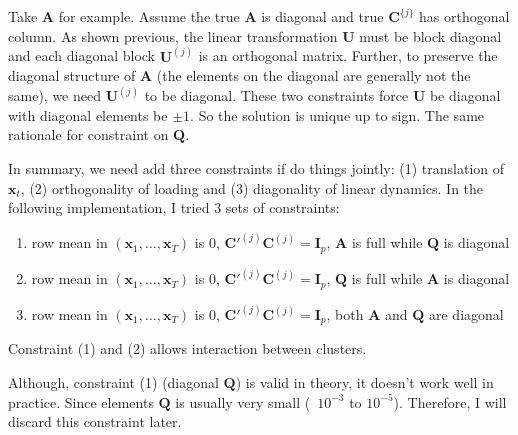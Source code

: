 \documentclass[]{article}
\begin{document}
Take \(\mathbf{A}\) for example. Assume the true \(\mathbf{A}\) is diagonal and true
\(\mathbf{C}^{\{ j\}}\) has orthogonal column. As shown previous, the linear transformation \(\mathbf{U}\) must be block diagonal and each diagonal block
\(\mathbf{U}^{(j)}\) is an orthogonal matrix. Further, to preserve the diagonal
structure of \(\mathbf{A}\) (the elements on the diagonal are generally not the
same), we need \(\mathbf{U}^{(j)}\) to be diagonal. These two constraints force
\(\mathbf{U}\) be diagonal with diagonal elements be \(\pm 1\). So the solution
is unique up to sign. The same rationale for constraint on \(\mathbf{Q}\).

In summary, we need add three constraints if do things jointly: (1) translation of \(\mathbf{x}_{t}\),
(2) orthogonality of loading and (3) diagonality of linear dynamics. In the following implementation, I tried 3 sets of constraints:

\begin{enumerate}
	\def\labelenumi{(\arabic{enumi})}
	\item
	row mean in \((\mathbf{x}_{1},\ldots,\mathbf{x}_{T})\) is 0,
	\(\mathbf{C}'^{(j)}\mathbf{C}^{(j)} = \mathbf{I}_{p}\), \(\mathbf{A}\) is full while \(\mathbf{Q}\) is
	diagonal
	\item
	row mean in \((\mathbf{x}_{1},\ldots,\mathbf{x}_{T})\) is 0,
	\(\mathbf{C}'^{(j)}\mathbf{C}^{(j)} = \mathbf{I}_{p}\), \(\mathbf{Q}\) is full while \(\mathbf{A}\) is
	diagonal
	\item
	row mean in \((\mathbf{x}_{1},\ldots,\mathbf{x}_{T})\) is 0,
	\(\mathbf{C}'^{(j)}\mathbf{C}^{(j)} = \mathbf{I}_{p}\), both \(\mathbf{A}\) and \(\mathbf{Q}\) are diagonal
\end{enumerate}

Constraint (1) and (2) allows interaction between clusters.

Although, constraint (1) (diagonal $\mathbf{Q}$) is valid in theory, it doesn't work well in practice. Since elements $\mathbf{Q}$ is usually very small (~$10^{-3}$ to $10^{-5}$).
Therefore, I will discard this constraint later.
\end{document}
